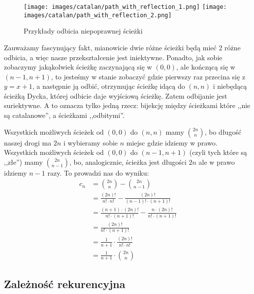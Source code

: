             \begin{figure}[ht]
                \centering
                \texttt{[image: images/catalan/path\_with\_reflection\_1.png]}
                \texttt{[image: images/catalan/path\_with\_reflection\_2.png]}

                \caption{Przykłady odbicia niepoprawnej ścieżki}
            \end{figure}
            
            Zauważamy fascynujący fakt, mianowicie dwie różne ścieżki będą mieć 2 różne odbicia, a więc nasze przekształcenie jest iniektywne. Ponadto, jak sobie zobaczymy jakąkolwiek ścieżkę zaczynającą się w $(0,0)$, ale kończącą się w $(n-1,n+1)$, to jesteśmy w stanie zobaczyć gdzie pierwszy raz przecina się z $y = x+1$, a następnie ją odbić, otrzymując ścieżkę idącą do $(n,n)$ i niebędącą ścieżką Dycka, której odbicie daje wyjściową ścieżkę. Zatem odbijanie jest suriektywne. A to oznacza tylko jedną rzecz: bijekcję między ścieżkami które ,,nie są catalanowe'', a ścieżkami ,,odbitymi''.
            
            Wszystkich możliwych ścieżek od $(0,0)$ do $(n,n)$ mamy $\binom{2n}{n}$, bo długość naszej drogi ma $2n$ i wybieramy sobie $n$ miejsc gdzie idziemy w prawo. Wszystkich możliwych ścieżek od $(0,0)$ do $(n-1,n+1)$ (czyli tych które są ,,złe'') mamy $\binom{2n}{n-1}$, bo, analogicznie, ścieżka jest długości $2n$ ale w prawo idziemy $n-1$ razy. To prowadzi nas do wyniku:
            \begin{equation*}
                \begin{split}
                    c_n
                        &= \binom{2n}{n} - \binom{2n}{n-1} \\
                        &= \frac{(2n)!}{n! \cdot n!} - \frac{(2n)!}{(n-1)! \cdot (n+1)!} \\
                        &= \frac{(n+1) \cdot (2n)!}{n! \cdot (n+1)!} - \frac{n \cdot (2n)!}{n! \cdot (n+1)!}\\
                        &= \frac{(2n)!}{n! \cdot (n+1)!} \\
                        &= \frac{1}{n+1} \cdot \frac {(2n)!}{n! \cdot n!} \\
                        &= \frac{1}{n+1} \cdot \binom{2n}{n}
                \end{split}
            \end{equation*}
        \subsection{Zależność rekurencyjna}

